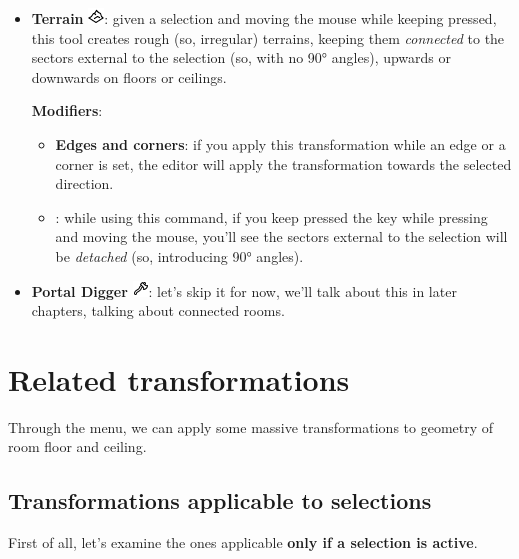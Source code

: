 \begin{itemize}
    \item \textbf{Terrain} \includegraphics[scale=0.5]{Resources/icons_toolbox/toolbox_GroupTerrain-16.png}: given a selection and moving the mouse while keeping  pressed, this tool creates rough (so, irregular) terrains, keeping them \emph{connected} to the sectors external to the selection (so, with no 90° angles), upwards or downwards on floors or ceilings.
    \par \textbf{Modifiers}:
    \begin{itemize}
        \item \textbf{Edges and corners}: if you apply this transformation while an edge or a corner is set, the editor will apply the transformation towards the selected direction.
        \item \keys{\Alt}: while using this command, if you keep pressed the \keys{\Alt} key while pressing  and moving the mouse, you'll see the sectors external to the selection will be \emph{detached} (so, introducing 90° angles).
    \end{itemize}
\end{itemize}

\begin{itemize}
    \item \textbf{Portal Digger} \includegraphics[scale=1]{Resources/icons_toolbox/toolbox_PortalDigger-16.png}: let's skip it for now, we'll talk about this in later chapters, talking about connected rooms. %
\end{itemize}


\chapter{Related transformations}

Through the  menu, we can apply some massive transformations to geometry of room floor and ceiling.

\section{Transformations applicable to selections}

First of all, let's examine the ones applicable \textbf{only if a selection is active}.

